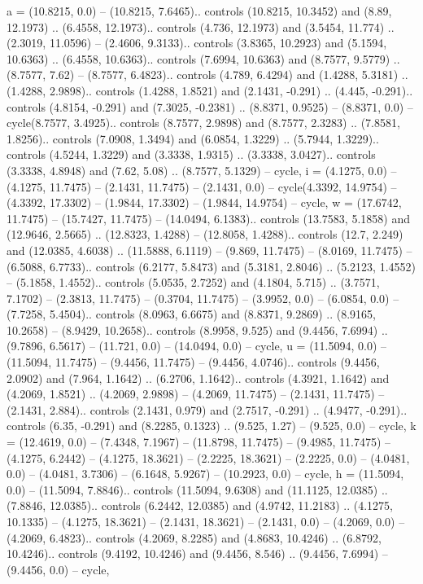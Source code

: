 {a} = {(10.8215, 0.0) -- (10.8215, 7.6465).. controls (10.8215, 10.3452) and (8.89, 12.1973) .. (6.4558, 12.1973).. controls (4.736, 12.1973) and (3.5454, 11.774) .. (2.3019, 11.0596) -- (2.4606, 9.3133).. controls (3.8365, 10.2923) and (5.1594, 10.6363) .. (6.4558, 10.6363).. controls (7.6994, 10.6363) and (8.7577, 9.5779) .. (8.7577, 7.62) -- (8.7577, 6.4823).. controls (4.789, 6.4294) and (1.4288, 5.3181) .. (1.4288, 2.9898).. controls (1.4288, 1.8521) and (2.1431, -0.291) .. (4.445, -0.291).. controls (4.8154, -0.291) and (7.3025, -0.2381) .. (8.8371, 0.9525) -- (8.8371, 0.0) -- cycle(8.7577, 3.4925).. controls (8.7577, 2.9898) and (8.7577, 2.3283) .. (7.8581, 1.8256).. controls (7.0908, 1.3494) and (6.0854, 1.3229) .. (5.7944, 1.3229).. controls (4.5244, 1.3229) and (3.3338, 1.9315) .. (3.3338, 3.0427).. controls (3.3338, 4.8948) and (7.62, 5.08) .. (8.7577, 5.1329) -- cycle},
{i} = {(4.1275, 0.0) -- (4.1275, 11.7475) -- (2.1431, 11.7475) -- (2.1431, 0.0) -- cycle(4.3392, 14.9754) -- (4.3392, 17.3302) -- (1.9844, 17.3302) -- (1.9844, 14.9754) -- cycle},
{w} = {(17.6742, 11.7475) -- (15.7427, 11.7475) -- (14.0494, 6.1383).. controls (13.7583, 5.1858) and (12.9646, 2.5665) .. (12.8323, 1.4288) -- (12.8058, 1.4288).. controls (12.7, 2.249) and (12.0385, 4.6038) .. (11.5888, 6.1119) -- (9.869, 11.7475) -- (8.0169, 11.7475) -- (6.5088, 6.7733).. controls (6.2177, 5.8473) and (5.3181, 2.8046) .. (5.2123, 1.4552) -- (5.1858, 1.4552).. controls (5.0535, 2.7252) and (4.1804, 5.715) .. (3.7571, 7.1702) -- (2.3813, 11.7475) -- (0.3704, 11.7475) -- (3.9952, 0.0) -- (6.0854, 0.0) -- (7.7258, 5.4504).. controls (8.0963, 6.6675) and (8.8371, 9.2869) .. (8.9165, 10.2658) -- (8.9429, 10.2658).. controls (8.9958, 9.525) and (9.4456, 7.6994) .. (9.7896, 6.5617) -- (11.721, 0.0) -- (14.0494, 0.0) -- cycle},
{u} = {(11.5094, 0.0) -- (11.5094, 11.7475) -- (9.4456, 11.7475) -- (9.4456, 4.0746).. controls (9.4456, 2.0902) and (7.964, 1.1642) .. (6.2706, 1.1642).. controls (4.3921, 1.1642) and (4.2069, 1.8521) .. (4.2069, 2.9898) -- (4.2069, 11.7475) -- (2.1431, 11.7475) -- (2.1431, 2.884).. controls (2.1431, 0.979) and (2.7517, -0.291) .. (4.9477, -0.291).. controls (6.35, -0.291) and (8.2285, 0.1323) .. (9.525, 1.27) -- (9.525, 0.0) -- cycle},
{k} = {(12.4619, 0.0) -- (7.4348, 7.1967) -- (11.8798, 11.7475) -- (9.4985, 11.7475) -- (4.1275, 6.2442) -- (4.1275, 18.3621) -- (2.2225, 18.3621) -- (2.2225, 0.0) -- (4.0481, 0.0) -- (4.0481, 3.7306) -- (6.1648, 5.9267) -- (10.2923, 0.0) -- cycle},
{h} = {(11.5094, 0.0) -- (11.5094, 7.8846).. controls (11.5094, 9.6308) and (11.1125, 12.0385) .. (7.8846, 12.0385).. controls (6.2442, 12.0385) and (4.9742, 11.2183) .. (4.1275, 10.1335) -- (4.1275, 18.3621) -- (2.1431, 18.3621) -- (2.1431, 0.0) -- (4.2069, 0.0) -- (4.2069, 6.4823).. controls (4.2069, 8.2285) and (4.8683, 10.4246) .. (6.8792, 10.4246).. controls (9.4192, 10.4246) and (9.4456, 8.546) .. (9.4456, 7.6994) -- (9.4456, 0.0) -- cycle},
